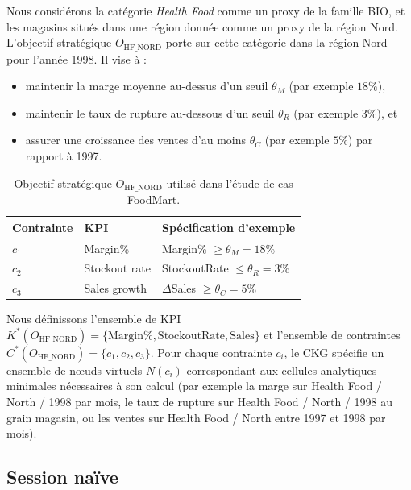 \documentclass[journal]{IEEEtran}
\begin{document}
Nous considérons la catégorie \textit{Health Food} comme un proxy de la famille BIO, et les magasins situés dans une région donnée comme un proxy de la région Nord. L'objectif stratégique $O_{\mathrm{HF\_NORD}}$ porte sur cette catégorie dans la région Nord pour l'année 1998. Il vise à :
\begin{itemize}
  \item maintenir la marge moyenne au-dessus d'un seuil $\theta_M$ (par exemple $18\%$),
  \item maintenir le taux de rupture au-dessous d'un seuil $\theta_R$ (par exemple $3\%$), et
  \item assurer une croissance des ventes d'au moins $\theta_C$ (par exemple $5\%$) par rapport à 1997.
\end{itemize}

\begin{table}[!t]
\centering
\caption{Objectif stratégique $O_{\mathrm{HF\_NORD}}$ utilisé dans l'étude de cas FoodMart.}
\begin{tabular}{@{}lll@{}}
\toprule
Contrainte & KPI & Spécification d'exemple \\
\midrule
$c_1$ & Margin\% & Margin\% $\ge \theta_M = 18\%$ \\
$c_2$ & Stockout rate & StockoutRate $\le \theta_R = 3\%$ \\
$c_3$ & Sales growth & $\Delta$Sales $\ge \theta_C = 5\%$ \\
\bottomrule
\end{tabular}
\label{tab:case-objective}
\end{table}

Nous définissons l'ensemble de KPI $K^*(O_{\mathrm{HF\_NORD}})=\{\mathrm{Margin\%},\mathrm{StockoutRate},\mathrm{Sales}\}$ et l'ensemble de contraintes $C^*(O_{\mathrm{HF\_NORD}})=\{c_1,c_2,c_3\}$. Pour chaque contrainte $c_i$, le CKG spécifie un ensemble de nœuds virtuels $N(c_i)$ correspondant aux cellules analytiques minimales nécessaires à son calcul (par exemple la marge sur Health Food / North / 1998 par mois, le taux de rupture sur Health Food / North / 1998 au grain magasin, ou les ventes sur Health Food / North entre 1997 et 1998 par mois).

\subsection{Session naïve}
\end{document}
